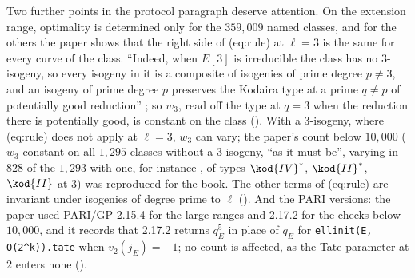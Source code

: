 \begin{sloppypar}
Two further points in the protocol paragraph deserve attention. On the extension range, optimality is determined only for the $359{,}009$ named classes, and for the
others the paper shows that the right side of (eq:rule) at $\ell=3$ is the same for every curve of the class. ``Indeed, when $E[3]$ is irreducible the class has no
$3$-isogeny, so every isogeny in it is a composite of isogenies of prime degree $p\ne3$, and an isogeny of prime degree $p$ preserves the Kodaira type at a prime $q\ne p$ of
potentially good reduction'' \cite[Theorem 5.4(1)]{DokDok15}; so $w_3$, read off the type at $q=3$ when the reduction there is potentially good, is constant on the class
(). With a $3$-isogeny, where (eq:rule) does not apply at $\ell=3$, $w_3$ can vary; the paper's count below $10{,}000$ ($w_3$ constant on all $1{,}295$
classes without a $3$-isogeny, ``as it must be'', varying in $828$ of the $1{,}293$ with one, for instance , of types $\kod{IV}^*$, $\kod{II}^*$, $\kod{II}$ at $3$) was reproduced for
the book. The other terms of (eq:rule) are invariant under isogenies of degree prime to $\ell$ (). And the PARI versions: the paper used
PARI/GP 2.15.4 for the large ranges and 2.17.2 for the checks below $10{,}000$, and it records that 2.17.2 returns $q_E^5$ in place of $q_E$ for \texttt{ellinit(E, O(2\^{}k)).tate} when
$v_2(j_E)=-1$; no count is affected, as the Tate parameter at $2$ enters none ().


\end{sloppypar}

